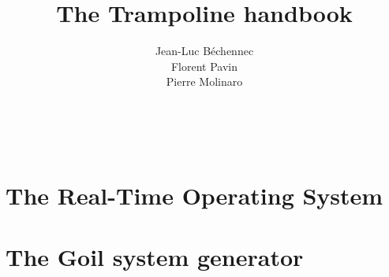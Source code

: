 \documentclass[11pt]{manual}
\title{The Trampoline handbook}
\author{Jean-Luc B\'echennec\\Florent Pavin\\Pierre Molinaro}
\begin{document}
\maketitle
~\newpage
\setcounter{tocdepth}{2}
\tableofcontents

\part{The Real-Time Operating System}









\part{The Goil system generator}



\printindex



 
\end{document}
